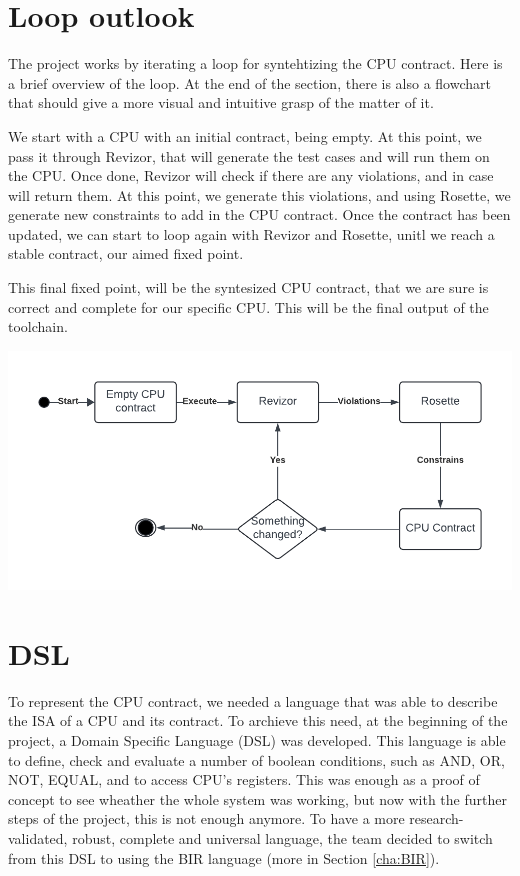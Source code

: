 \section{Loop outlook}
\label{cha: Loop outlook} The project works by iterating a loop for syntehtizing
the CPU contract. Here is a brief overview of the loop. At the end of the
section, there is also a flowchart that should give a more visual and intuitive grasp
of the matter of it.

We start with a CPU with an initial contract, being empty. At this point, we
pass it through Revizor, that will generate the test cases and will run them on the
CPU. Once done, Revizor will check if there are any violations, and in case will
return them. At this point, we generate this violations, and using Rosette, we
generate new constraints to add in the CPU contract. Once the contract has been updated,
we can start to loop again with Revizor and Rosette, unitl we reach a stable contract,
our aimed fixed point.

This final fixed point, will be the syntesized CPU contract, that we are sure is
correct and complete for our specific CPU. This will be the final output of the toolchain.
\begin{center}
  \includegraphics[width=.6\textwidth]{images/Thesis.png}
\end{center}

\section{DSL}
\label{cha:DSL} To represent the CPU contract, we needed a language that was
able to describe the ISA of a CPU and its contract. To archieve this need, at
the beginning of the project, a Domain Specific Language (DSL) was developed.
This language is able to define, check and evaluate a number of boolean conditions,
such as AND, OR, NOT, EQUAL, and to access CPU's registers. This was enough as a
proof of concept to see wheather the whole system was working, but now with the
further steps of the project, this is not enough anymore. To have a more
research-validated, robust, complete and universal language, the team decided to
switch from this DSL to using the BIR language (more in Section \ref*{cha:BIR}).


